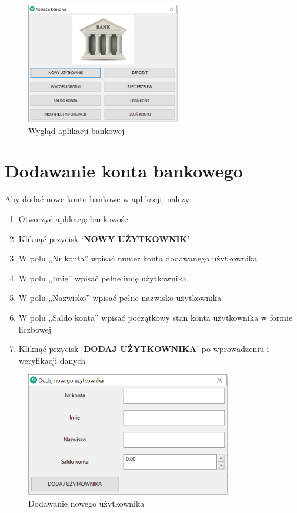 \documentclass[a4paper,12pt]{article}
\begin{document}
	\begin{figure}[h]
		\centering
		\includegraphics[width=0.6\textwidth]{wyglad.png}
		\caption{Wygląd aplikacji bankowej}
		\label{wyglad}
	\end{figure}


	\newpage
	\section{Dodawanie konta bankowego}
	Aby dodać nowe konto bankowe w aplikacji, należy:
	\begin{enumerate}
		\item Otworzyć aplikację bankowości
		\item Kliknąć przycisk ‘\textbf{NOWY UŻYTKOWNIK}’
		\item W polu „Nr konta” wpisać numer konta dodawanego użytkownika
		\item W polu „Imię” wpisać pełne imię użytkownika
		\item W polu „Nazwisko” wpisać pełne nazwisko użytkownika
		\item W polu „Saldo konta” wpisać początkowy stan konta użytkownika w formie liczbowej
		\item Kliknąć przycisk ‘\textbf{DODAJ UŻYTKOWNIKA}’ po wprowadzeniu i weryfikacji danych
	\end{enumerate}
		\begin{figure}[h]
		\centering
		\includegraphics[width=0.8\textwidth]{new_user.png}
		\caption{Dodawanie nowego użytkownika}
		\label{new_user}
	\end{figure}
\newpage
\end{document}
